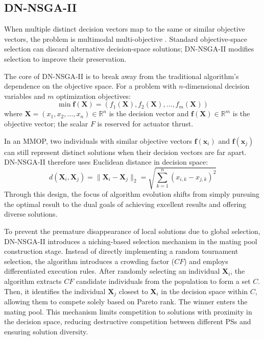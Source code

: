\subsection{DN-NSGA-II}
When multiple distinct decision vectors map to the same or similar objective vectors, the problem is multimodal multi-objective \cite{deb1999multi,liang2016multimodal}. Standard objective-space selection can discard alternative decision-space solutions; DN-NSGA-II modifies selection to improve their preservation.
\par The core of DN-NSGA-II is to break away from the traditional algorithm's dependence on the objective space. For a problem with $n$-dimensional decision variables and $m$ optimization objectives:
\begin{equation}
	\min \bm{f}(\mathbf{X}) = (f_1(\mathbf{X}), f_2(\mathbf{X}), \ldots, f_m(\mathbf{X}))
\end{equation}
where $\bm{X}=(x_1, x_2, \dots, x_n) \in \mathbb{R}^n$ is the decision vector and $\bm{f}(\bm{X}) \in \mathbb{R}^m$ is the objective vector; the scalar $F$ is reserved for actuator thrust.
\par In an MMOP, two individuals with similar objective vectors $\bm{f}(\mathbf{x}_i)$ and $\bm{f}(\mathbf{x}_j)$ can still represent distinct solutions when their decision vectors are far apart. DN-NSGA-II therefore uses Euclidean distance in decision space:
\begin{equation}
	d(\mathbf{X}_i, \mathbf{X}_j) = \|\mathbf{X}_i - \mathbf{X}_j\|_2 = \sqrt{\sum_{k=1}^{n} (x_{i,k} - x_{j,k})^2}
\end{equation}
Through this design, the focus of algorithm evolution shifts from simply pursuing the optimal result to the dual goals of achieving excellent results and offering diverse solutions.
\par To prevent the premature disappearance of local solutions due to global selection, DN-NSGA-II introduces a niching-based selection mechanism in the mating pool construction stage. Instead of directly implementing a random tournament selection, the algorithm introduces a crowding factor ($CF$) and employs differentiated execution rules. After randomly selecting an individual $\mathbf{X}_i$, the algorithm extracts $CF$ candidate individuals from the population to form a set $C$. Then, it identifies the individual $\mathbf{X}_j$ closest to $\mathbf{X}_i$ in the decision space within $C$, allowing them to compete solely based on Pareto rank. The winner enters the mating pool. This mechanism limits competition to solutions with proximity in the decision space, reducing destructive competition between different PSs and ensuring solution diversity.
